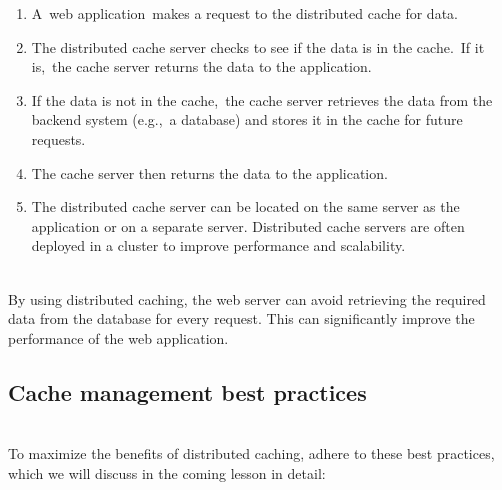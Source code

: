 \begin{enumerate}
\item
\protect{}\label{VnPoAkeACEXduRaZ1amsw}
A~web application~makes a request to the distributed cache for data.
\item
\protect{}\label{evDz8HvHv2IeC9xsyfnPM}
The distributed cache server checks to see if the data is in the cache.~If it is,~the cache server returns the data to the application.
\item
\protect{}\label{c-n6ImgimbcmagQMiqj98}
If the data is not in the cache,~the cache server retrieves the data from the backend system (e.g.,~a database) and stores it in the cache for future requests.
\item
\protect{}\label{YooeviGlZ-b9obUUy6i6o}
The cache server then returns the data to the application.
\item
\protect{}\label{DlhbOCpaK4C14xrRm-Oy5}
The distributed cache server can be located on the same server as the application or on a separate server. Distributed cache servers are often deployed in a cluster to improve performance and scalability.
\end{enumerate}
\\
By using distributed caching, the web server can avoid retrieving the required data from the database for every request. This can significantly improve the performance of the web application.

\subsection{Cache management best practices}\label{9JZb7ufvZOD5rn5UjxgcF}
\\
To maximize the benefits of distributed caching, adhere to these best practices, which we will discuss in the coming lesson in detail:

